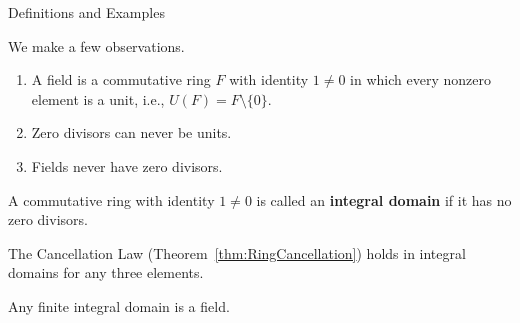 \begin{section}{Definitions and Examples}
\begin{remark}
We make a few observations.
\begin{enumerate}[label=\rm{(\alph*)}]
\item A field is a commutative ring $F$ with identity $1\neq 0$ in which every nonzero element is a unit, i.e., $U(F)=F\setminus\{0\}$.
\item Zero divisors can never be units.
\item Fields never have zero divisors.
\end{enumerate}
\end{remark}

\begin{definition}
A commutative ring with identity $1\neq 0$ is called an \textbf{integral domain} if it has no zero divisors.
\end{definition}

\begin{remark}
The Cancellation Law (Theorem~\ref{thm:RingCancellation}) holds in integral domains for any three elements.
\end{remark}

\begin{corollary}
Any finite integral domain is a field.
\end{corollary}



\end{section}
